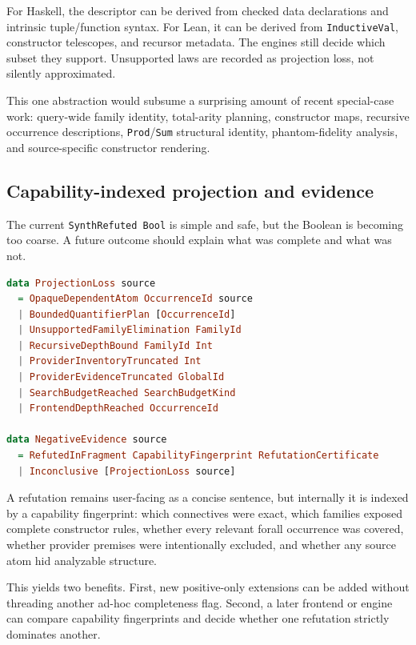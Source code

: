\documentclass[11pt]{article}
\newcommand{\code}[1]{\texttt{#1}}
\begin{document}
For Haskell, the descriptor can be derived from checked data declarations and
intrinsic tuple/function syntax.  For Lean, it can be derived from
\code{InductiveVal}, constructor telescopes, and recursor metadata.  The
engines still decide which subset they support.  Unsupported laws are recorded
as projection loss, not silently approximated.

This one abstraction would subsume a surprising amount of recent special-case
work: query-wide family identity, total-arity planning, constructor maps,
recursive occurrence descriptions, \code{Prod}/\code{Sum} structural identity,
phantom-fidelity analysis, and source-specific constructor rendering.

\subsection{Capability-indexed projection and evidence}

The current \code{SynthRefuted Bool} is simple and safe, but the Boolean is
becoming too coarse.  A future outcome should explain what was complete and
what was not.

\begin{lstlisting}[language=Haskell,caption={Structured projection loss and negative evidence.}]
data ProjectionLoss source
  = OpaqueDependentAtom OccurrenceId source
  | BoundedQuantifierPlan [OccurrenceId]
  | UnsupportedFamilyElimination FamilyId
  | RecursiveDepthBound FamilyId Int
  | ProviderInventoryTruncated Int
  | ProviderEvidenceTruncated GlobalId
  | SearchBudgetReached SearchBudgetKind
  | FrontendDepthReached OccurrenceId

data NegativeEvidence source
  = RefutedInFragment CapabilityFingerprint RefutationCertificate
  | Inconclusive [ProjectionLoss source]
\end{lstlisting}

A refutation remains user-facing as a concise sentence, but internally it is
indexed by a capability fingerprint: which connectives were exact, which
families exposed complete constructor rules, whether every relevant forall
occurrence was covered, whether provider premises were intentionally excluded,
and whether any source atom hid analyzable structure.

This yields two benefits.  First, new positive-only extensions can be added
without threading another ad-hoc completeness flag.  Second, a later frontend
or engine can compare capability fingerprints and decide whether one
refutation strictly dominates another.
\end{document}
